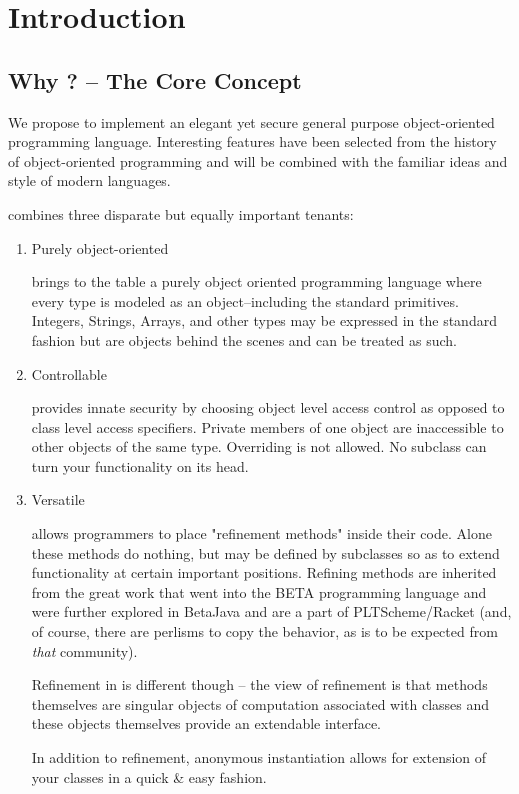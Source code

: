 \section{Introduction}
\subsection{Why \Lang{}? -- The Core Concept}
We propose to implement an elegant yet secure general purpose object-oriented programming language. Interesting features have been selected from the history of object-oriented programming and will be combined with the familiar ideas and style of modern languages.

\Lang{} combines three disparate but equally important tenants:

\begin{enumerate}
\item Purely object-oriented 

\Lang{} brings to the table a purely object oriented programming language where every type is modeled as an object--including the standard primitives. Integers, Strings, Arrays, and other types may be expressed in the standard fashion but are objects behind the scenes and can be treated as such.

\item Controllable

\Lang{} provides innate security by choosing object level access control as opposed to class level access specifiers. Private members of one object are inaccessible to other objects of the same type. Overriding is not allowed. No subclass can turn your functionality on its head.

\item Versatile

\Lang{} allows programmers to place "refinement methods" inside their code. Alone these methods do nothing, but may be defined by subclasses so as to extend functionality at certain important positions. Refining methods are inherited from the great work that went into the BETA programming language and were further explored in BetaJava and are a part of PLTScheme/Racket (and, of course, there are perlisms to copy the behavior, as is to be expected from \emph{that} community).

Refinement in \Lang{} is different though -- the \Lang{} view of refinement is that methods themselves are singular objects of computation associated with classes and these objects themselves provide an extendable interface.

In addition to refinement, anonymous instantiation allows for extension of your classes in a quick \& easy fashion.
\end{enumerate}

